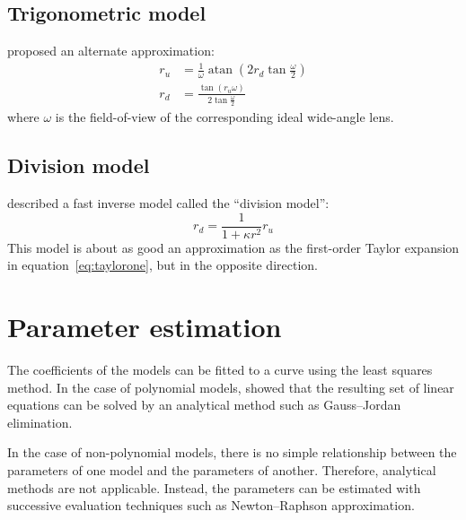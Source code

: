 \documentclass[english,12pt]{ifimaster}
\DeclareMathOperator{\atan}{atan}
\begin{document}


\subsection{Trigonometric model}


\citet{devernay01:-straig-lines} proposed an alternate approximation:
\begin{align}
  \label{eq:devernay}
  r_u &= \tfrac{1}{\omega} \atan(2r_d\tan{\tfrac{\omega}{2}})\\
  r_d &= \frac{\tan(r_u\omega)}{2\tan{\tfrac{\omega}{2}}}
\end{align}
where $\omega$ is the field-of-view of the corresponding ideal
wide-angle lens.


\subsection{Division model}

\citet{fitzgibbon01:-simul} described a fast inverse model called the
``division model'':
\begin{equation}
  \label{eq:division}
  r_d = \frac{1}{1 + \kappa r^2}r_u
\end{equation}
This model is about as good an approximation as the first-order Taylor
expansion in equation~{\ref{eq:taylorone}}, but in the opposite
direction.

\section{Parameter estimation}

The coefficients of the models can be fitted to a curve using the
least squares method. In the case of polynomial models,
\citet{basu95:-alter} showed that the resulting set of linear
equations can be solved by an analytical method such as Gauss--Jordan
elimination.

In the case of non-polynomial models, there is no simple relationship
between the parameters of one model and the parameters of another.
Therefore, analytical methods are not applicable. Instead, the
parameters can be estimated with successive evaluation techniques such
as Newton--Raphson approximation.
\end{document}
